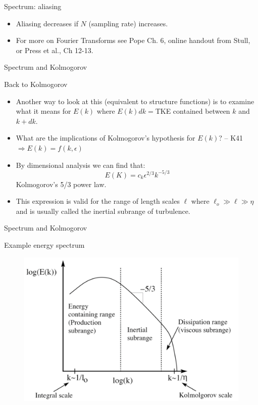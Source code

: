 
\begin{frame}{Spectrum: aliasing}
\begin{itemize}
	\item Aliasing decreases if $N$ (sampling rate) increases.
	\item For more on Fourier Transforms see Pope Ch. 6, online handout from Stull, or Press et al., Ch 12-13.
\end{itemize}
\end{frame}

\begin{frame}{Spectrum and Kolmogorov}

Back to Kolmogorov
\begin{itemize}
	\item Another way to look at this (equivalent to structure functions) is to examine what it means for $E(k)$ where $E(k)dk =$TKE contained between $k$ and $k+dk$.
	\item What are the implications of Kolmogorov’s hypothesis for $E(k)$? -- K41$\Rightarrow E(k) = f(k,\epsilon)$
	\item By dimensional analysis we can find that: $$E(K) = c_k \epsilon^{2/3}k^{-5/3}$$ Kolmogorov's 5/3 power law.
	\item This expression is valid for the range of length scales $\ell$ where $\ell_o \gg \ell \gg \eta$ and is usually called the inertial subrange of turbulence.
\end{itemize}
\end{frame}

\begin{frame}{Spectrum and Kolmogorov}

Example energy spectrum
\begin{figure}
	\includegraphics[width=\textwidth]{spectrum2.png}
\end{figure}
\end{frame}



